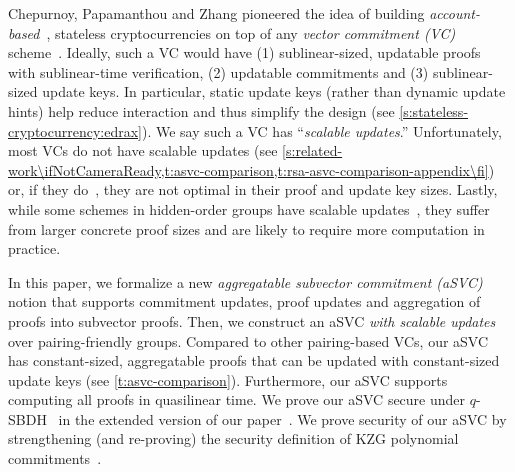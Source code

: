 Chepurnoy, Papamanthou and Zhang pioneered the idea of building \textit{account-based}~\cite{Ethereum}, stateless cryptocurrencies on top of any \textit{vector commitment (VC)} scheme~\cite{CPZ18}.
Ideally, such a VC would have (1) sublinear-sized, updatable proofs with sublinear-time verification, (2) updatable commitments and (3) sublinear-sized update keys.
In particular, static update keys (rather than dynamic update hints) help reduce interaction and thus simplify the design (see \cref{s:stateless-cryptocurrency:edrax}).
We say such a VC has ``\textit{scalable updates}.''
Unfortunately, most VCs do not have scalable updates (see \cref{s:related-work\ifNotCameraReady,t:asvc-comparison,t:rsa-asvc-comparison-appendix\fi}) or, if they do~\cite{CPZ18,Tomescu20}, they are not optimal in their proof and update key sizes.
Lastly, while some schemes in hidden-order groups have scalable updates~\cite{CFG+20}, they suffer from larger concrete proof sizes and are likely to require more computation in practice.

In this paper, we formalize a new \textit{aggregatable subvector commitment (aSVC)} notion that supports commitment updates, proof updates and aggregation of proofs into subvector proofs.
Then, we construct an aSVC \textit{with scalable updates} over pairing-friendly groups.
Compared to other pairing-based VCs, our aSVC has constant-sized, aggregatable proofs that can be updated with constant-sized update keys (see \cref{t:asvc-comparison}).
Furthermore, our aSVC supports computing all proofs in quasilinear time.
\ifCameraReady
We prove our aSVC secure under $q$-SBDH~\cite{Goyal07} in the extended version of our paper~\cite{TAB+20e}.
\else
We prove security of our aSVC by strengthening (and re-proving) the security definition of KZG polynomial commitments~\cite{KZG10a}.
\fi

